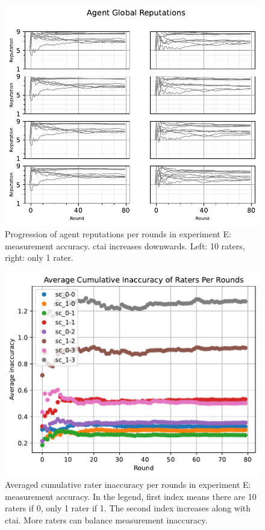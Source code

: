 \documentclass[%
    ]{\PathToTumTemplate/thesis/tum_thesis}
\begin{document}
\begin{figure}[tbp]
  \begin{center}
        \includegraphics[width=0.75\linewidth]	{../results/e/ReputationsPerRounds_joined.pdf}
    \caption{
 	Progression of agent reputations per rounds in experiment E: measurement accuracy.
    \gls{ctai} increases downwards.
    Left: 10 raters, right: only 1 rater.
    }
    \label{fig:res_e_reps}
  \end{center}
\end{figure}

\begin{figure}[tbp]
  \begin{center}
        \includegraphics[width=0.75\linewidth]	{../results/e/AvgAccuracyPerRound.pdf}
    \caption{
    Averaged cumulative rater inaccuracy per rounds in experiment E: measurement accuracy.
    In the legend, first index means there are 10 raters if 0, only 1 rater if 1.
    The second index increases along with \gls{ctai}.
    More raters can balance measurement inaccuracy.
    }
    \label{fig:res_e_rateinaccuracy}
  \end{center}
\end{figure}
\end{document}
